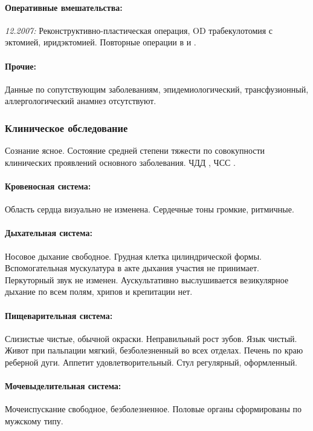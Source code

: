 \documentclass[a4paper,14pt]{extarticle}
\newcommand{\bpm}{уд/мин}
\newcommand{\mpm}{/мин}
\newcommand{\pdate}[1]{\emph{#1:} }
\begin{document}
\paragraph{Оперативные вмешательства:} \pdate{12.2007} Реконструктивно-пластическая операция, OD трабекулотомия с эктомией, иридэктомией. Повторные операции в  и .

\paragraph{Прочие:} Данные по сопутствующим заболеваниям, эпидемиологический, трансфузионный, аллергологический анамнез отсутствуют.

\subsubsection*{Клиническое обследование}

Сознание ясное.
Состояние средней степени тяжести по совокупности клинических проявлений основного заболевания.
ЧДД \numprint[\mpm]{26}, ЧСС \numprint[\bpm]{82}.

\paragraph{Кровеносная система:} Область сердца визуально не изменена. Сердечные тоны громкие, ритмичные. 

\paragraph{Дыхательная система:} Носовое дыхание свободное. Грудная клетка цилиндрической формы. Вспомогательная мускулатура в акте дыхания участия не принимает. Перкуторный звук не изменен. Аускультативно выслушивается везикулярное дыхание по всем полям, хрипов и крепитации нет.

\paragraph{Пищеварительная система:} Слизистые чистые, обычной окраски. Неправильный рост зубов. Язык чистый. Живот при пальпации мягкий, безболезненный во всех отделах. Печень по краю реберной дуги. Аппетит удовлетворительный. Стул регулярный, оформленный.

\paragraph{Мочевыделительная система:} Мочеиспускание свободное, безболезненное. Половые органы сформированы по мужскому типу.
\end{document}
